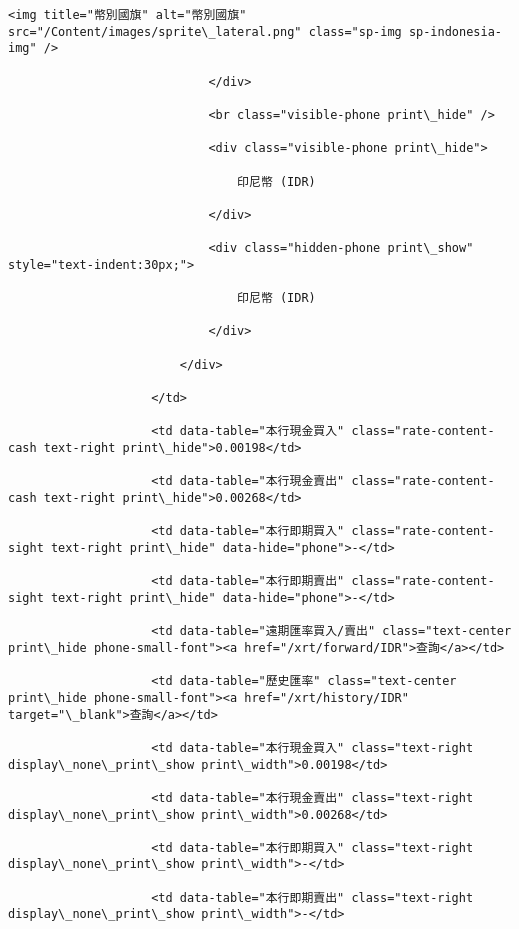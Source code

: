 \documentclass[11pt]{article}
\begin{document}
\begin{Verbatim}[commandchars=\\\{\}]
                                <img title="幣別國旗" alt="幣別國旗" src="/Content/images/sprite\_lateral.png" class="sp-img sp-indonesia-img" />

                            </div>

                            <br class="visible-phone print\_hide" />

                            <div class="visible-phone print\_hide">

                                印尼幣 (IDR)

                            </div>

                            <div class="hidden-phone print\_show" style="text-indent:30px;">

                                印尼幣 (IDR)

                            </div>

                        </div>

                    </td>

                    <td data-table="本行現金買入" class="rate-content-cash text-right print\_hide">0.00198</td>

                    <td data-table="本行現金賣出" class="rate-content-cash text-right print\_hide">0.00268</td>

                    <td data-table="本行即期買入" class="rate-content-sight text-right print\_hide" data-hide="phone">-</td>

                    <td data-table="本行即期賣出" class="rate-content-sight text-right print\_hide" data-hide="phone">-</td>

                    <td data-table="遠期匯率買入/賣出" class="text-center print\_hide phone-small-font"><a href="/xrt/forward/IDR">查詢</a></td>

                    <td data-table="歷史匯率" class="text-center print\_hide phone-small-font"><a href="/xrt/history/IDR" target="\_blank">查詢</a></td>

                    <td data-table="本行現金買入" class="text-right display\_none\_print\_show print\_width">0.00198</td>

                    <td data-table="本行現金賣出" class="text-right display\_none\_print\_show print\_width">0.00268</td>

                    <td data-table="本行即期買入" class="text-right display\_none\_print\_show print\_width">-</td>

                    <td data-table="本行即期賣出" class="text-right display\_none\_print\_show print\_width">-</td>


\end{Verbatim}
\end{document}
